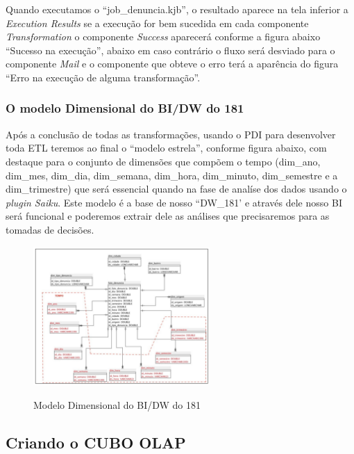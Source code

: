 Quando executamos o ``job\_denuncia.kjb'', o resultado aparece na tela inferior a \textit{Execution Results} se a execu\c{c}\~{a}o for bem sucedida em cada componente \textit{Transformation} o  componente \textit{Success} aparecer\'{a} conforme a figura abaixo ``Sucesso na execu\c{c}\~{a}o'', abaixo em caso contr\'{a}rio o fluxo ser\'{a} desviado para o componente \textit{Mail} e o componente que obteve o erro ter\'{a} a aparência do figura ``Erro na execu\c{c}\~{a}o de alguma transforma\c{c}\~{a}o''.

\subsubsection{O modelo Dimensional do BI/DW do 181}

Ap\'os a conclus\~{a}o de todas as transforma\c{c}\~{o}es, usando o PDI para desenvolver toda ETL teremos ao final o ``modelo estrela'', conforme figura abaixo, com destaque para o conjunto de dimens\~{o}es que comp\~{o}em o tempo (dim\_ano, dim\_mes, dim\_dia, dim\_semana, dim\_hora, dim\_minuto, dim\_semestre e a dim\_trimestre) que ser\'{a} essencial quando na fase de anal\'{i}se dos dados usando o \textit{plugin Saiku}. Este modelo \'{e} a base de nosso 
``DW\_181' e atrav\'{e}s dele nosso BI ser\'{a} funcional e poderemos extrair dele as an\'{a}lises que precisaremos para as tomadas de decis\~{o}es.

\begin{figure}[H]
	\vspace*{0,2cm}
    \centering
    \caption{Modelo Dimensional do BI/DW do 181}
    \includegraphics[width=0.6\textwidth]{./04-figuras/figura-moddim}
    \label{fig:ilustfigmoddim}
\end{figure}
\vspace*{-0,9cm}
{\raggedright {}} 

\subsection{Criando o CUBO OLAP}

